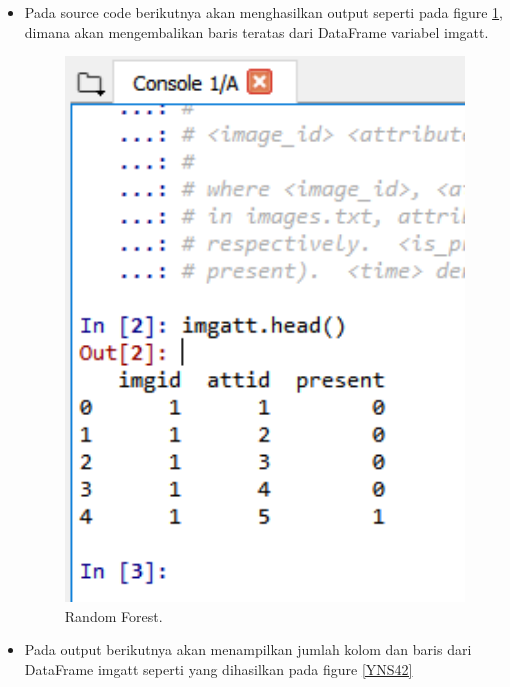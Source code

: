 \begin{enumerate}
\begin{itemize}
\item Pada source code berikutnya akan menghasilkan output seperti pada figure \ref{YNS41}, dimana akan mengembalikan baris teratas dari DataFrame variabel imgatt.

	\begin{figure}[ht]
	\centerline{\includegraphics[width=1\textwidth]{figures/YN/Chapter3/No4/YNS41.png}}
	\caption{Random Forest.}
	\label{YNS41}
	\end{figure}

\item Pada output berikutnya akan menampilkan jumlah kolom dan baris dari DataFrame imgatt seperti yang dihasilkan pada figure \ref{YNS42}


\end{itemize}
\end{enumerate}
